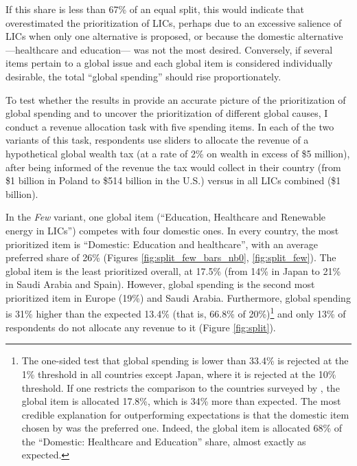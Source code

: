\documentclass[12pt,english]{article}
\begin{document}
If this share is less than 67\% of an equal split, this would indicate that \cite{fabre_majority_2025} overestimated the prioritization of LICs, perhaps due to an excessive salience of LICs when only one alternative is proposed, or because the domestic alternative ---healthcare and education--- was not the most desired. %
Conversely, if several items pertain to a global issue and each global item is considered individually desirable, the total ``global spending'' should rise proportionately. 

To test whether the results in \cite{fabre_majority_2025} provide an accurate picture of the %
prioritization of global spending and to uncover the prioritization of different global causes, I conduct a revenue allocation task with five spending items. 
In each of the two variants of this task, respondents use sliders to allocate the revenue of a hypothetical global wealth tax (at a rate of 2\% on wealth in excess of \$5 million), after being informed of the revenue the tax would collect in their country (from \$1 billion in Poland to \$514 billion in the U.S.) versus in all LICs combined (\$1 billion). 

In the \textit{Few} variant, one global item (``Education, Healthcare and Renewable energy in LICs'') competes with four domestic ones. %
In every country, the most prioritized item is ``Domestic: Education and healthcare'', with an average preferred share of 26\% (Figures \ref{fig:split_few_bars_nb0}, \ref{fig:split_few}). The global item is the least prioritized overall, at 17.5\% (from 14\% in Japan to 21\% in Saudi Arabia and Spain). However, global spending is the second most prioritized item in Europe (19\%) and Saudi Arabia. Furthermore, global spending is 31\% higher than the expected 13.4\% (that is, 66.8\% of %
20\%)\footnote{The one-sided test that global spending is lower than 33.4\% is rejected at the 1\% threshold in all countries except Japan, where it is rejected at the 10\% threshold. If one restricts the comparison to the countries surveyed by \cite{fabre_majority_2025}, the global item is allocated 17.8\%, which is 34\% more than expected. The most credible explanation for outperforming expectations is that the domestic item chosen by \cite{fabre_majority_2025} was the preferred one. Indeed, the global item is allocated 68\% of the ``Domestic: Healthcare and Education'' share, almost exactly as expected.} 
and only 13\% of respondents do not allocate any revenue to it (Figure \ref{fig:split}). 
\end{document}
